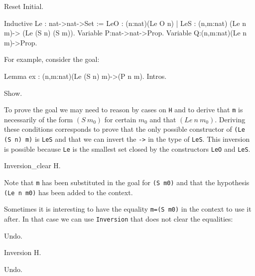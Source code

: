 \begin{coq_example*}
\begin{coq_eval}
Reset Initial.
\end{coq_eval}

\begin{coq_example*}
Inductive Le : nat->nat->Set :=
  LeO : (n:nat)(Le O n)  |  LeS : (n,m:nat) (Le n m)-> (Le (S n) (S m)).
Variable P:nat->nat->Prop.
Variable Q:(n,m:nat)(Le n m)->Prop.
\end{coq_example*}

For example, consider the goal:

\begin{coq_eval}
Lemma ex : (n,m:nat)(Le (S n) m)->(P n m).
Intros.
\end{coq_eval}

\begin{coq_example}
Show.
\end{coq_example}

To prove the goal we may need to reason by cases on \texttt{H} and to 
 derive that \texttt{m}  is necessarily of
the form $(S~m_0)$ for certain $m_0$ and that $(Le~n~m_0)$.  
Deriving these conditions corresponds to prove that the
only possible constructor of \texttt{(Le (S n) m)}  is
\texttt{LeS} and that we can invert the 
\texttt{->} in the type  of \texttt{LeS}.  
This inversion is possible because \texttt{Le} is the smallest set closed by
the constructors \texttt{LeO} and \texttt{LeS}.

\begin{coq_example}
Inversion_clear  H.
\end{coq_example}

Note that \texttt{m} has been substituted in the goal for \texttt{(S m0)}
and that the hypothesis \texttt{(Le n m0)} has been added to the
context.

Sometimes it is
interesting to have the equality \texttt{m=(S m0)} in the
context to use it after. In that case we can use  \texttt{Inversion} that
does not clear the equalities:

\begin{coq_example*}
Undo.
\end{coq_example*}

\begin{coq_example}
Inversion H.
\end{coq_example}

\begin{coq_eval}
Undo.
\end{coq_eval}



\end{coq_example*}
